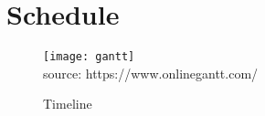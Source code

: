 \newpage
\section{Schedule}
\begin{figure}[H]
    \caption{Timeline}\label{fig:gantt}
    \texttt{[image: gantt]}
    \\
    source: https://www.onlinegantt.com/
\end{figure}